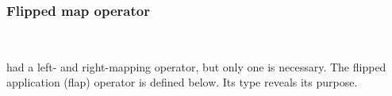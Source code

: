 \documentclass[authoryear, acmsmall, screen, review, nonacm]{acmart} %
\begin{document}
\subsubsection{Flipped map operator}~

 had a left- and right-mapping operator, but only one is necessary. The flipped application (flap) operator is defined below. Its type reveals its purpose.

\begin{code}%
\>[0]\AgdaSpace{}%
\AgdaSymbol{:}\AgdaSpace{}%
\AgdaSpace{}%
\AgdaSpace{}%
\AgdaSymbol{(}\AgdaOperator{\AgdaInductiveConstructor{R[}}\AgdaSpace{}%
\AgdaSpace{}%
\AgdaSpace{}%
\AgdaSpace{}%
\AgdaOperator{\AgdaInductiveConstructor{]}}\AgdaSpace{}%
\AgdaSpace{}%
\AgdaSpace{}%
\AgdaSpace{}%
\AgdaOperator{\AgdaInductiveConstructor{R[}}\AgdaSpace{}%
\AgdaSpace{}%
\AgdaOperator{\AgdaInductiveConstructor{]}}\AgdaSymbol{)}\<%
\\
\>[0]\AgdaSpace{}%
\AgdaSymbol{=}\AgdaSpace{}%
\AgdaSpace{}%
\AgdaSymbol{(}\AgdaSpace{}%
\AgdaSymbol{((}\AgdaSpace{}%
\AgdaSymbol{((}\AgdaSpace{}%
\AgdaSymbol{)}\AgdaSpace{}%
\AgdaSpace{}%
\AgdaSymbol{(}\AgdaSpace{}%
\AgdaSymbol{(}\AgdaSpace{}%
\AgdaSymbol{))))}\AgdaSpace{}%
\AgdaOperator{\AgdaInductiveConstructor{<\$>}}\AgdaSpace{}%
\AgdaSymbol{(}\AgdaSpace{}%
\AgdaSymbol{(}\AgdaSpace{}%
\AgdaSymbol{))))}\<%
\\
%
\\[\AgdaEmptyExtraSkip]%
\>[0]\AgdaSpace{}%
\AgdaSymbol{:}\AgdaSpace{}%
\AgdaSpace{}%
\AgdaSpace{}%
\AgdaSymbol{(}\AgdaOperator{\AgdaInductiveConstructor{R[}}\AgdaSpace{}%
\AgdaSpace{}%
\AgdaSpace{}%
\AgdaSpace{}%
\AgdaOperator{\AgdaInductiveConstructor{]}}\AgdaSymbol{)}\AgdaSpace{}%

\end{code}
\end{document}
